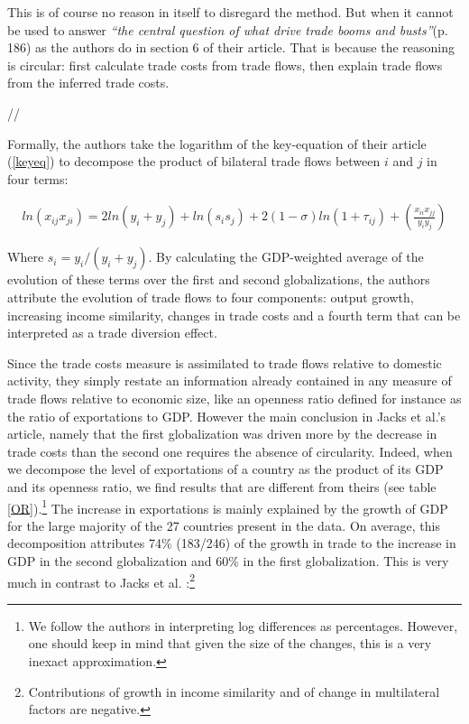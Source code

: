 \documentclass{article}
\begin{document}
This is of course no reason in itself to disregard the method.
But when it cannot be used to answer \emph{``the central
question of what drive trade booms and busts''}(p. 186) as the
authors do in section 6 of their article. That is because the reasoning is
circular: first calculate trade costs from trade flows, then
explain trade flows from the inferred trade costs.

//

Formally, the authors take the logarithm of the key-equation of
their article (\ref{keyeq}) to decompose the product of
bilateral trade flows between $i$ and $j$ in four terms:

\begin{eqnarray}
ln (x_{ij}x_{ji})= 2 ln(y_i + y_j)+ ln (s_i s_j) + 2(1-\sigma)ln(1+\tau_{ij})+ \left(\frac{x_{ii} x_{jj}}{y_i y_j}\right)
\end{eqnarray}

Where $s_i=y_i/(y_i+y_j)$. By calculating the GDP-weighted
average of the evolution of these terms over the first and
second globalizations, the authors attribute the evolution of
trade flows to four components: output growth, increasing
income similarity, changes in trade costs and a fourth term
that can be interpreted as a trade diversion effect.

Since the trade costs measure is assimilated to trade flows
relative to domestic activity, they simply restate
 an information already contained in any measure of
trade flows relative to economic size, like an openness ratio
defined for instance as the ratio of exportations to GDP.
However the main conclusion in Jacks et al.'s article, namely
that the first globalization was driven more by the decrease in
trade costs than the second one requires the absence of circularity.
Indeed, when we decompose the level of
exportations of a country as the product of its GDP and its
openness ratio, we find results that are different from theirs (see table \ref{OR}).\footnote{We follow
the authors in interpreting log differences as percentages. However, one should keep in mind that given the
size of the changes, this is a very inexact approximation.} The increase in exportations is mainly explained by the growth of
GDP for the large majority of the 27 countries present in the
data. On average, this decomposition attributes 74\% (183/246) of
the growth in trade to the increase in GDP in the second
globalization and 60\% in the first globalization. This is very much in contrast to 
Jacks et al. :\footnote{Contributions of growth in income
similarity and of change in multilateral factors are negative.}
 
\end{document}
